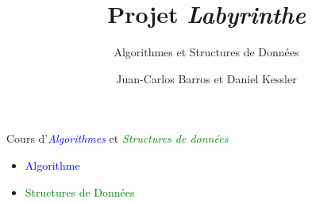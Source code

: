 \documentclass[]{beamer}
\title{Projet \textit{Labyrinthe}}
\subtitle{Algorithmes et Structures de Données}
\author{Juan-Carlos Barros et Daniel Kessler}
\begin{document}
\begin{frame}
  \titlepage
\end{frame} %

\begin{frame}
  Cours d'\textit{\textcolor<1>{blue}{Algorithmes}}
  et \textit{\textcolor<1>{green}{Structures de données}}
  \par\bigskip
  \par
  \begin{minipage}{.65\linewidth}
  \begin{itemize}
  \item<2->\textcolor{blue}{Algorithme}\par{}
  \item<2->\textcolor{green}{Structures de Données}%
  \par{}
  \end{itemize}
  \end{minipage}
  \begin{minipage}{.3\linewidth}
  \end{minipage}
\end{frame} %
\end{document}
